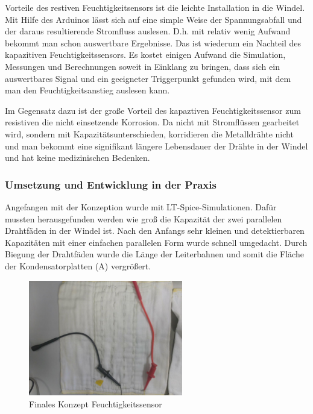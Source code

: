 Vorteile des restiven Feuchtigkeitsensors  ist die leichte Installation in die Windel. Mit Hilfe des Arduinos lässt sich auf eine simple Weise der Spannungsabfall und der daraus resultierende Stromfluss auslesen. D.h. mit relativ wenig Aufwand bekommt man schon auswertbare Ergebnisse. Das ist wiederum ein Nachteil des kapazitiven Feuchtigkeitssensors. Es kostet einigen Aufwand die Simulation, Messungen und Berechnungen soweit in Einklang zu bringen, dass sich ein auswertbares Signal und ein geeigneter Triggerpunkt gefunden wird, mit dem man den Feuchtigkeitsanstieg auslesen kann.

Im Gegensatz dazu ist der große Vorteil des kapaztiven Feuchtigkeitssensor zum resistiven die nicht einsetzende Korrosion. Da nicht mit Stromflüssen gearbeitet wird, sondern mit Kapazitätsunterschieden, korridieren die Metalldrähte nicht und man bekommt eine signifikant längere Lebensdauer der Drähte in der Windel und hat keine medizinischen Bedenken.

\subsubsection{Umsetzung und Entwicklung in der Praxis}
Angefangen mit der Konzeption wurde mit LT-Spice-Simulationen. Dafür mussten herausgefunden werden wie groß die Kapazität der zwei parallelen Drahtfäden in der Windel ist. Nach den Anfangs sehr kleinen und detektierbaren Kapazitäten mit einer einfachen parallelen Form wurde schnell umgedacht. Durch Biegung der Drahtfäden wurde die Länge der Leiterbahnen und somit die Fläche der Kondensatorplatten (A) vergrößert.

\begin{figure}[ht]
	\centering
		\includegraphics[width=0.6\textwidth]{includes/kom/graphics/windel_cap_sensor_final}
	\caption{Finales Konzept Feuchtigkeitssensor}
	\label{fig:cap_sensor_final}
\end{figure}

